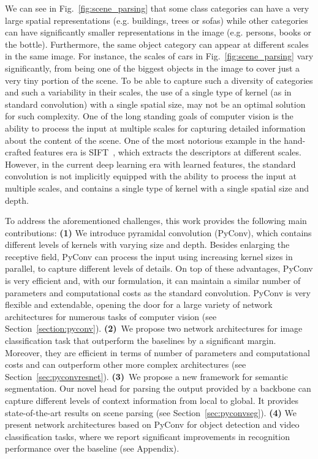 \documentclass{article}
\begin{document}
We can see in  Fig.~\ref{fig:scene_parsing} that some class categories can have a very large spatial representations (e.g. buildings,  trees  or sofas) while other categories can have significantly smaller representations in the image (e.g. persons,  books or the bottle). Furthermore, the same object category can appear at different scales in the same image. For instance, the scales of cars in Fig.~\ref{fig:scene_parsing} vary significantly, from being one of the biggest objects in the image to cover just a very tiny portion of the scene. To be able to capture such a diversity of categories and such a variability in their scales, the use of a single type of kernel (as in standard convolution) with a single spatial size, may not be an optimal solution for such complexity.
One of the long standing goals of computer vision is the ability to process the input at multiple scales for capturing detailed information about the content of the scene.
One of the most notorious example in the hand-crafted features era is SIFT~\cite{lowe2004distinctive}, which extracts the descriptors at different scales. However, in the current deep learning era with learned features, the standard convolution is not implicitly equipped with the ability to process the input at multiple scales, and contains a single type of kernel with a single spatial size and depth. 

To address the aforementioned challenges, this work provides the following main contributions:
\textbf{(1)} We introduce pyramidal convolution (PyConv), which contains different levels of kernels with varying size and depth.
Besides enlarging the receptive field, PyConv can process the input using increasing kernel sizes in parallel, to capture different levels of details. On top of these advantages, PyConv is very efficient and, with our formulation, it can maintain a similar number of parameters and computational costs as the standard convolution. PyConv is very flexible and extendable, opening the door for a large variety of network architectures for numerous tasks of computer vision (see Section~\ref{section:pyconv}).
\textbf{(2)}~We propose two network architectures for image classification task that outperform the baselines by a significant margin. Moreover,  they are efficient in terms of number of parameters and computational costs and  can outperform other more complex architectures (see Section~\ref{sec:pyconvresnet}).
\textbf{(3)}~We propose a new framework for semantic segmentation. Our novel head for parsing the output provided by a backbone can capture different levels of context information from local to global. It provides state-of-the-art results on scene parsing (see Section~\ref{sec:pyconvseg}).
\textbf{(4)} We present network architectures based on PyConv for object detection and video classification tasks, where we report significant improvements in recognition performance over the baseline (see Appendix).
\end{document}
